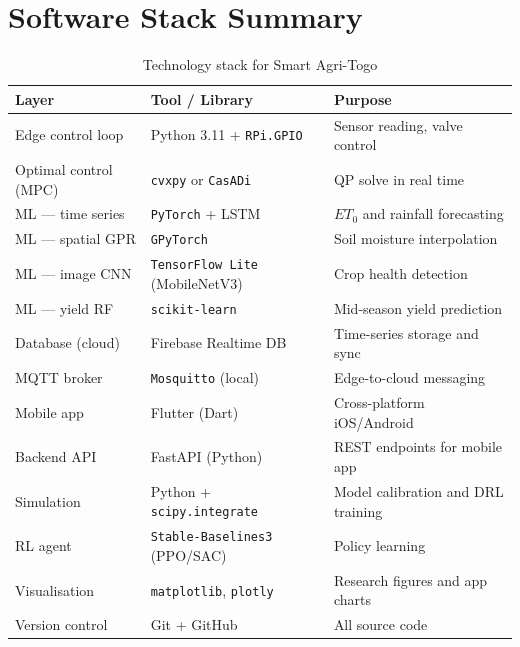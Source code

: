 \documentclass[12pt, a4paper]{report}
\begin{document}
\chapter{Software Stack Summary}

\begin{table}[H]
\centering
\caption{Technology stack for Smart Agri-Togo}
\renewcommand{\arraystretch}{1.3}
\begin{tabular}{lll}
\toprule
\textbf{Layer} & \textbf{Tool / Library} & \textbf{Purpose} \\
\midrule
Edge control loop & Python 3.11 + \texttt{RPi.GPIO} & Sensor reading, valve control \\
Optimal control (MPC) & \texttt{cvxpy} or \texttt{CasADi} & QP solve in real time \\
ML — time series & \texttt{PyTorch} + LSTM & $ET_0$ and rainfall forecasting \\
ML — spatial GPR & \texttt{GPyTorch} & Soil moisture interpolation \\
ML — image CNN & \texttt{TensorFlow Lite} (MobileNetV3) & Crop health detection \\
ML — yield RF & \texttt{scikit-learn} & Mid-season yield prediction \\
Database (cloud) & Firebase Realtime DB & Time-series storage and sync \\
MQTT broker & \texttt{Mosquitto} (local) & Edge-to-cloud messaging \\
Mobile app & Flutter (Dart) & Cross-platform iOS/Android \\
Backend API & FastAPI (Python) & REST endpoints for mobile app \\
Simulation & Python + \texttt{scipy.integrate} & Model calibration and DRL training \\
RL agent & \texttt{Stable-Baselines3} (PPO/SAC) & Policy learning \\
Visualisation & \texttt{matplotlib}, \texttt{plotly} & Research figures and app charts \\
Version control & Git + GitHub & All source code \\
\bottomrule
\end{tabular}
\end{table}
\end{document}
